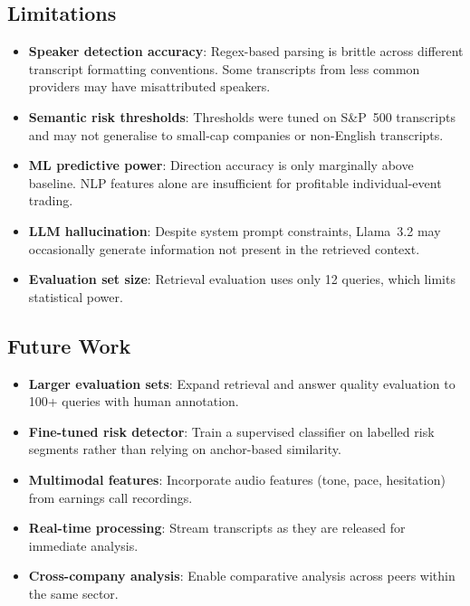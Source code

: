 \documentclass[12pt,a4paper]{article}
\begin{document}
\subsection{Limitations}

\begin{itemize}[noitemsep]
    \item \textbf{Speaker detection accuracy}: Regex-based parsing is brittle across different transcript formatting conventions. Some transcripts from less common providers may have misattributed speakers.
    \item \textbf{Semantic risk thresholds}: Thresholds were tuned on S\&P~500 transcripts and may not generalise to small-cap companies or non-English transcripts.
    \item \textbf{ML predictive power}: Direction accuracy is only marginally above baseline. NLP features alone are insufficient for profitable individual-event trading.
    \item \textbf{LLM hallucination}: Despite system prompt constraints, Llama~3.2 may occasionally generate information not present in the retrieved context.
    \item \textbf{Evaluation set size}: Retrieval evaluation uses only 12 queries, which limits statistical power.
\end{itemize}

\subsection{Future Work}

\begin{itemize}[noitemsep]
    \item \textbf{Larger evaluation sets}: Expand retrieval and answer quality evaluation to 100+ queries with human annotation.
    \item \textbf{Fine-tuned risk detector}: Train a supervised classifier on labelled risk segments rather than relying on anchor-based similarity.
    \item \textbf{Multimodal features}: Incorporate audio features (tone, pace, hesitation) from earnings call recordings.
    \item \textbf{Real-time processing}: Stream transcripts as they are released for immediate analysis.
    \item \textbf{Cross-company analysis}: Enable comparative analysis across peers within the same sector.
\end{itemize}
\end{document}
